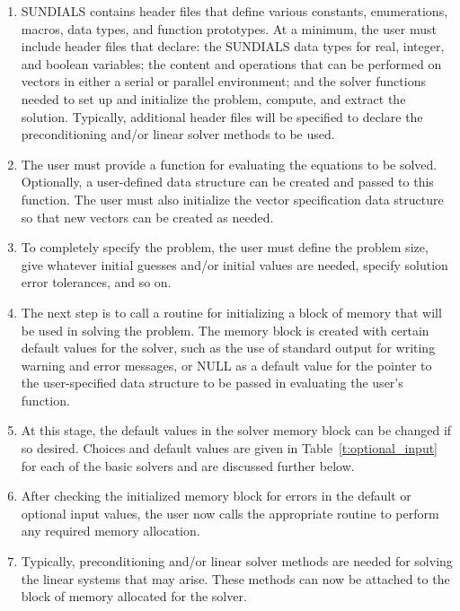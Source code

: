 \begin{enumerate}

\item \label{sun_headers}
SUNDIALS contains header files that define various constants,
enumerations, macros, data types, and function prototypes.  At a
minimum, the user must include header files that declare: the SUNDIALS
data types for real, integer, and boolean variables; the content and
operations that can be performed on vectors in either a serial or
parallel environment; and the solver functions needed to
set up and initialize the problem, compute, and extract the solution. 
Typically, additional header files will be specified to declare the 
preconditioning and/or linear solver methods to be used.

\item \label{sun_problem}
The user must provide a function for evaluating the equations to be
solved. Optionally, a user-defined data structure can be created and
passed to this function. The user must also initialize the vector
specification data structure so that new vectors can be created as needed.

\item \label{sun_size}
To completely specify the problem, the user must define the problem
size, give whatever initial guesses and/or initial values are
needed, specify solution error tolerances, and so on. 

\item \label{sun_create}
The next step is to call a routine for initializing a block of memory
that will be used in solving the problem. The memory block is created
with certain default values for the solver, such as the use of
standard output for writing warning and error messages, or NULL
as a default value for the pointer to the user-specified data
structure to be passed in evaluating the user's function.

\item \label{sun_set}
At this stage, the default values in the solver memory block can be
changed if so desired. Choices and default values are given in
Table~\ref{t:optional_input} for each of the basic solvers and
are discussed further below.

\item \label{sun_malloc}
After checking the initialized memory block for
errors in the default or optional input values, the user now calls 
the appropriate routine to perform any required
memory allocation.

\item \label{sun_linear}
Typically, preconditioning and/or linear solver methods are needed for
solving the linear systems that may arise. These methods can now be
attached to the block of memory allocated for the solver.


\end{enumerate}
